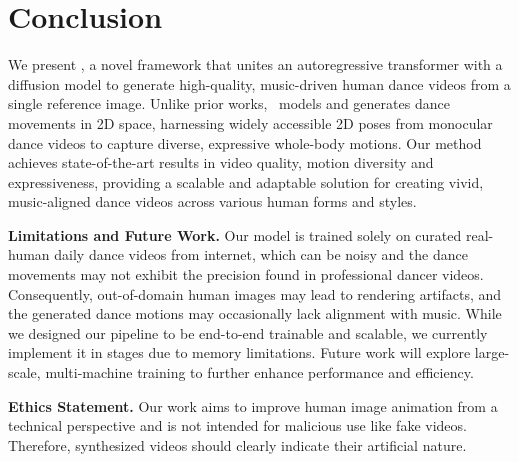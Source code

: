 \section{Conclusion}

We present \papername, a novel framework that unites an autoregressive transformer with a diffusion model to generate high-quality, music-driven human dance videos from a single reference image. Unlike prior works, \papername\ models and generates dance movements in 2D space, harnessing widely accessible 2D poses from monocular dance videos to capture diverse, expressive whole-body motions. Our method achieves state-of-the-art results in video quality, motion diversity and expressiveness, providing a scalable and adaptable solution for creating vivid, music-aligned dance videos across various human forms and styles.

\noindent\textbf{Limitations and Future Work.} Our model is trained solely on curated real-human daily dance videos from internet, 
which can be noisy and the dance movements may not exhibit the precision found in professional dancer videos.  Consequently, out-of-domain human images may lead to rendering artifacts, and the generated dance motions may occasionally lack alignment with music. While we designed our pipeline to be end-to-end trainable and scalable, we currently implement it in stages due to memory limitations. Future work will explore large-scale, multi-machine training to further enhance performance and efficiency.

\noindent\textbf{Ethics Statement.} Our work aims to improve human image animation from a technical perspective and is not intended for malicious use like fake videos. Therefore, synthesized videos should clearly indicate their artificial nature.




